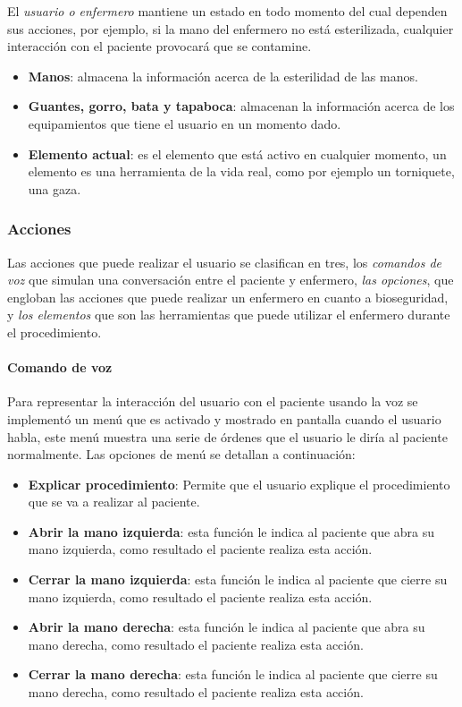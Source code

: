 
El \emph{usuario o enfermero} mantiene un estado en todo momento del cual
dependen sus acciones, por ejemplo, si la mano del enfermero no está
esterilizada, cualquier interacción con el paciente provocará que se
contamine.

\begin{itemize}
    \item \textbf{Manos}: almacena la información acerca de la esterilidad de
        las manos.
    \item \textbf{Guantes, gorro, bata y tapaboca}: almacenan la información
        acerca de los equipamientos que tiene el usuario en un momento dado.
    \item \textbf{Elemento actual}: es el elemento que está activo en
        cualquier momento, un elemento es una herramienta de la vida real,
        como por ejemplo un torniquete, una gaza.
\end{itemize}

\subsubsection{Acciones}

Las acciones que puede realizar el usuario se clasifican en tres, los
\emph{comandos de voz} que simulan una conversación entre el paciente y
enfermero, \emph{las opciones}, que engloban las acciones que puede realizar un
enfermero en cuanto a bioseguridad, y \emph{los elementos} que son las
herramientas que puede utilizar el enfermero durante el procedimiento.

\paragraph{Comando de voz}

Para representar la interacción del usuario con el paciente usando la voz se
implementó un menú que es activado y mostrado en pantalla cuando el usuario
habla, este menú muestra una serie de órdenes que el usuario le diría al
paciente normalmente. Las opciones de menú se detallan a continuación:

\begin{itemize}
    \item \textbf{Explicar procedimiento}: Permite que el usuario explique el
        procedimiento que se va a realizar al paciente. 
\item \textbf{Abrir la mano izquierda}: esta función le indica al paciente que
    abra su mano izquierda, como resultado el paciente realiza esta acción.
\item \textbf{Cerrar la mano izquierda}: esta función le indica al paciente que
    cierre su mano izquierda, como resultado el paciente realiza esta acción.
\item \textbf{Abrir la mano derecha}: esta función le indica al paciente que
    abra su mano derecha, como resultado el paciente realiza esta acción.
\item \textbf{Cerrar la mano derecha}: esta función le indica al paciente que
    cierre su mano derecha, como resultado el paciente realiza esta acción.
\end{itemize}

